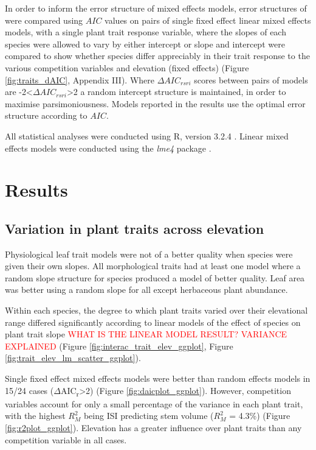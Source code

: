 \documentclass[a4paper,11pt]{article}
\newcommand{\todo}[1]{\textcolor{red}{#1}}   %
\begin{document}
In order to inform the error structure of mixed effects models, error structures of were compared using $AIC$ values on pairs of single fixed effect linear mixed effects models, with a single plant trait response variable, where the slopes of each species were allowed to vary by either intercept or slope and intercept were compared to show whether species differ appreciably in their trait response to the various competition variables and elevation (fixed effects) (Figure \ref{fig:traits_dAIC}, Appendix III). Where $\Delta{}AIC_{rsri}$ scores between pairs of models are -2\textless{}$\Delta{}AIC_{rsri}$\textgreater{}2 a random intercept structure is maintained, in order to maximise parsimoniousness. Models reported in the results use the optimal error structure according to $AIC$.

All statistical analyses were conducted using R, version 3.2.4 \citep{R2019}. Linear mixed effects models were conducted using the \textit{lme4} package \citep{Bates2015}.

\section{Results}

\subsection{Variation in plant traits across elevation}

Physiological leaf trait models were not of a better quality when species were given their own slopes. All morphological traits had at least one model where a random slope structure for species produced a model of better quality. Leaf area was better using a random slope for all except herbaceous plant abundance.

Within each species, the degree to which plant traits varied over their elevational range differed significantly according to linear models of the effect of species on plant trait slope \todo{WHAT IS THE LINEAR MODEL RESULT? VARIANCE EXPLAINED} (Figure \ref{fig:interac_trait_elev_ggplot}, Figure \ref{fig:trait_elev_lm_scatter_ggplot}).

Single fixed effect mixed effects models were better than random effects models in 15/24 cases ($\Delta$AIC\textsubscript{r}>2) (Figure \ref{fig:daicplot_ggplot}).  However, competition variables account for only a small percentage of the variance in each plant trait, with the highest $R_M^2$ being ISI predicting stem volume ($R_M^2$ = 4.3\%) (Figure \ref{fig:r2plot_ggplot}). Elevation has a greater influence over plant traits than any competition variable in all cases.
\end{document}
